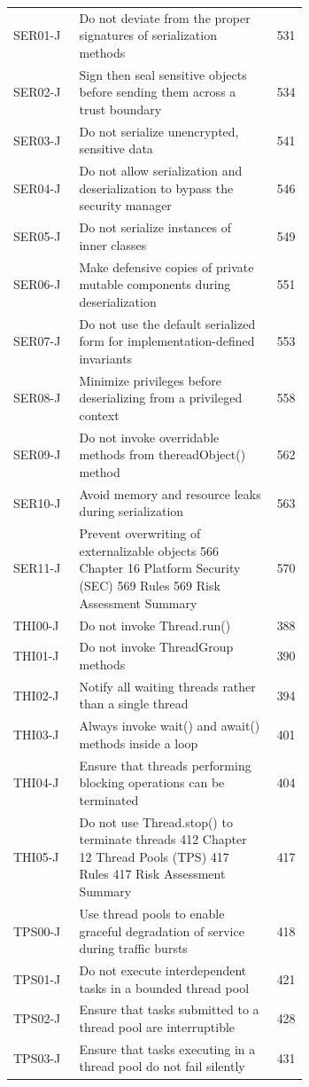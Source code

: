 \documentclass[11pt]{report}
\begin{document}
\begin{longtable}{@{}l>{\raggedright\arraybackslash}p{0.66\linewidth}r@{}}
SER01-J & Do not deviate from the proper signatures of serialization methods & 531\\
SER02-J & Sign then seal sensitive objects before sending them across a trust boundary & 534\\
SER03-J & Do not serialize unencrypted, sensitive data & 541\\
SER04-J & Do not allow serialization and deserialization to bypass the security manager & 546\\
SER05-J & Do not serialize instances of inner classes & 549\\
SER06-J & Make defensive copies of private mutable components during deserialization & 551\\
SER07-J & Do not use the default serialized form for implementation-defined invariants & 553\\
SER08-J & Minimize privileges before deserializing from a privileged context & 558\\
SER09-J & Do not invoke overridable methods from thereadObject() method & 562\\
SER10-J & Avoid memory and resource leaks during serialization & 563\\
SER11-J & Prevent overwriting of externalizable objects 566 Chapter 16 Platform Security (SEC) 569 Rules 569 Risk Assessment Summary & 570\\
THI00-J & Do not invoke Thread.run() & 388\\
THI01-J & Do not invoke ThreadGroup methods & 390\\
THI02-J & Notify all waiting threads rather than a single thread & 394\\
THI03-J & Always invoke wait() and await() methods inside a loop & 401\\
THI04-J & Ensure that threads performing blocking operations can be terminated & 404\\
THI05-J & Do not use Thread.stop() to terminate threads 412 Chapter 12 Thread Pools (TPS) 417 Rules 417 Risk Assessment Summary & 417\\
TPS00-J & Use thread pools to enable graceful degradation of service during traffic bursts & 418\\
TPS01-J & Do not execute interdependent tasks in a bounded thread pool & 421\\
TPS02-J & Ensure that tasks submitted to a thread pool are interruptible & 428\\
TPS03-J & Ensure that tasks executing in a thread pool do not fail silently & 431\\

\end{longtable}
\end{document}
